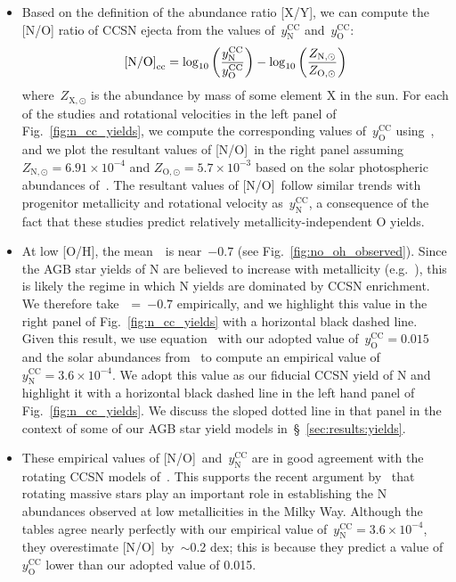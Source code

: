 \documentclass[ms.tex]{subfiles}
\begin{document}
\begin{itemize}
	\item Based on the definition of the abundance ratio [X/Y], we can compute 
	the [N/O] ratio of CCSN ejecta from the values of~$y_\text{N}^\text{CC}$ 
	and~$y_\text{O}^\text{CC}$: 
	\begin{equation} 
	\text{[N/O]}_\text{cc} = 
	\log_{10}\left(
	\frac{y_\text{N}^\text{CC}}{y_\text{O}^\text{CC}}
	\right) 
	- \log_{10}\left(
	\frac{Z_{\text{N},\odot}}{Z_{\text{O},\odot}}
	\right) 
	\label{eq:no_cc} 
	\end{equation} 
	where~$Z_{\text{X},\odot}$ is the abundance by mass of some element X in the 
	sun. 
	For each of the studies and rotational velocities in the left panel of 
	Fig.~\ref{fig:n_cc_yields}, we compute the corresponding values 
	of~$y_\text{O}^\text{CC}$ using~\vice, and we plot the resultant values of 
	[N/O]\subcc~in the right panel assuming 
	$Z_{\text{N},\odot} = 6.91\times10^{-4}$ and 
	$Z_{\text{O},\odot} = 5.7\times10^{-3}$ based on the solar photospheric 
	abundances of~\citet{Asplund2009}. 
	The resultant values of [N/O]\subcc~follow similar trends with progenitor 
	metallicity and rotational velocity as~$y_\text{N}^\text{CC}$, a 
	consequence of the fact that these studies predict relatively 
	metallicity-independent O yields. 

	\item At low [O/H], the mean~\no~is near~$-0.7$ (see 
	Fig.~\ref{fig:no_oh_observed}). 
	Since the AGB star yields of N are believed to increase with metallicity 
	(e.g.~\citealp{Cristallo2011, Cristallo2015, Ventura2013}), this is likely 
	the regime in which N yields are dominated by CCSN enrichment. 
	We therefore take~\no\subcc~=~$-0.7$ empirically, and we highlight 
	this value in the right panel of Fig.~\ref{fig:n_cc_yields} with a 
	horizontal black dashed line. 
	Given this result, we use equation~ with our adopted value 
	of~$y_\text{O}^\text{CC} = 0.015$ and the solar abundances 
	from~\citet{Asplund2009} to compute an empirical value 
	of~$y_\text{N}^\text{CC} = 3.6\times10^{-4}$. 
	We adopt this value as our fiducial CCSN yield of N and highlight it with 
	a horizontal black dashed line in the left hand panel of 
	Fig.~\ref{fig:n_cc_yields}. 
	We discuss the sloped dotted line in that panel in the context of some of 
	our AGB star yield models in~\S~\ref{sec:results:yields}. 

	\item These empirical values of [N/O]\subcc~and~$y_\text{N}^\text{CC}$ are 
	in good agreement with the rotating CCSN models of~\citet{Limongi2018}. 
	This supports the recent argument by~\citet*{Grisoni2021} that rotating 
	massive stars play an important role in establishing the N abundances 
	observed at low metallicities in the Milky Way. 
	Although the~\citet{Sukhbold2016} tables agree nearly perfectly with our 
	empirical value of~$y_\text{N}^\text{CC} = 3.6\times10^{-4}$, they 
	overestimate [N/O]\subcc~by~$\sim$0.2 dex; this is because they predict 
	a value of~$y_\text{O}^\text{CC}$ lower than our adopted value of 0.015. 


\end{itemize}
\end{document}
